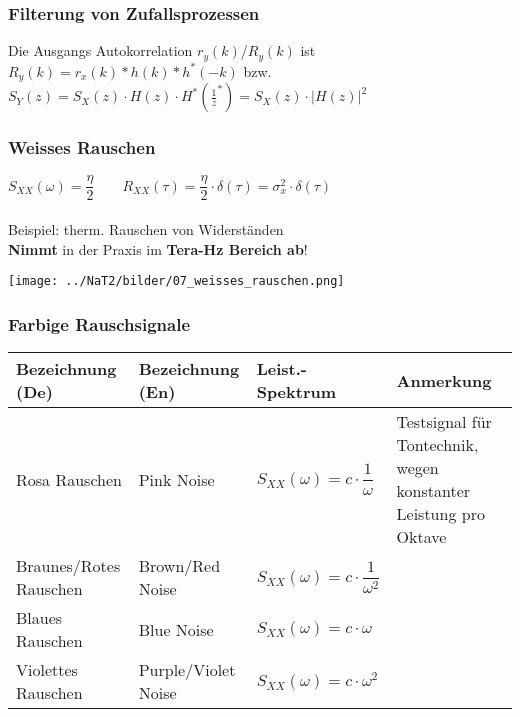 \subsubsection{Filterung von Zufallsprozessen}
Die Ausgangs Autokorrelation $r_y(k)$/$R_y(k)$ ist\\
 $R_y(k) = r_x(k)\ast h(k) \ast h^*(-k)$ bzw. $\boxed{S_{Y}(z) = S_{X}(z)\cdot H(z) \cdot H^*(\frac 1 z^*)=S_X(z)\cdot|H(z)|^2}$

\subsubsection{Weisses Rauschen}
\begin{center}
	\begin{minipage}{8cm}
		$S_{XX}(\omega) = \dfrac{\eta}{2} \qquad R_{XX}(\tau) = \dfrac{\eta}{2} \cdot \delta(\tau)= \sigma_x^2 \cdot \delta(\tau)$ \\ \\
		Beispiel: therm. Rauschen von Widerständen \\
		\textbf{Nimmt} in der Praxis im \textbf{Tera-Hz Bereich ab}!
  	\end{minipage}
	\begin{minipage}{10cm}
		\texttt{[image: ../NaT2/bilder/07\_weisses\_rauschen.png]}
  	\end{minipage}
\end{center}

\subsubsection{Farbige Rauschsignale}
\renewcommand{\arraystretch}{2}
\begin{tabular}[c]{ | p{4cm} | p{3.5cm} | p{3cm} | p{6cm} | }
	\hline
		\textbf{Bezeichnung (De)}
		& \textbf{Bezeichnung (En)}
		& \textbf{Leist.-Spektrum}
		& \textbf{Anmerkung} \\
	\hline
		Rosa Rauschen
		& Pink Noise
		& $S_{XX}(\omega) = c \cdot \dfrac{1}{\omega}$
		& Testsignal für Tontechnik, wegen konstanter Leistung pro Oktave \\
	\hline
		Braunes/Rotes Rauschen
		& Brown/Red Noise
		&	$S_{XX}(\omega) = c \cdot \dfrac{1}{\omega^2}$
		& \\
	\hline
		Blaues Rauschen
		& Blue Noise
		&	$S_{XX}(\omega) = c \cdot \omega$
		& \\
	\hline
		Violettes Rauschen
		& Purple/Violet Noise
		&	$S_{XX}(\omega) = c \cdot \omega^2$
		& \\
    \hline
\end{tabular}
\renewcommand{\arraystretch}{1}

